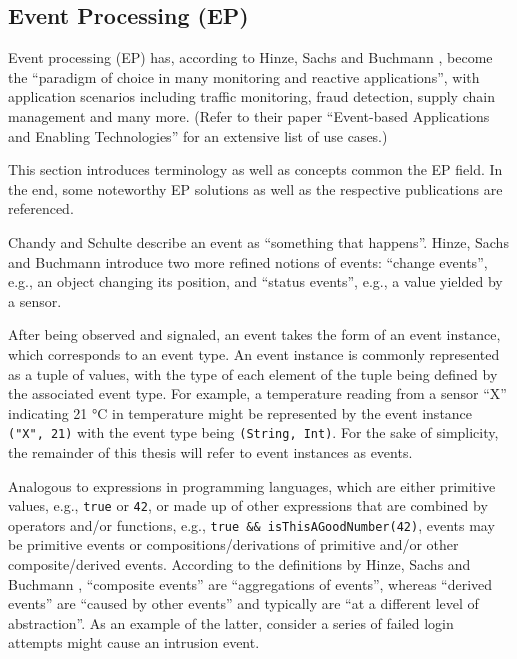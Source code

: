 \documentclass[article, 10pt, type=bsc, colorback, accentcolor=tud8b, parskip=half, bibliography=totocnumbered]{tudthesis}
\begin{document}
\subsection{Event Processing (EP)}
\label{sec:event_processing}

Event processing (EP) has, according to Hinze, Sachs and Buchmann \cite{Hinze:2009:EAE:1619258.1619260}, become the ``paradigm of choice in many monitoring and reactive applications'', with application scenarios including traffic monitoring, fraud detection, supply chain management and many more.
(Refer to their paper ``Event-based Applications and Enabling Technologies'' \cite{Hinze:2009:EAE:1619258.1619260} for an extensive list of use cases.)

This section introduces terminology as well as concepts common the EP field.
In the end, some noteworthy EP solutions as well as the respective publications are referenced.

Chandy and Schulte \cite{Chandy:2009:EPD:1594754} describe an event as ``something that happens''.
Hinze, Sachs and Buchmann \cite{Hinze:2009:EAE:1619258.1619260} introduce two more refined notions of events:
``change events'', e.g., an object changing its position, and ``status events'', e.g., a value yielded by a sensor.

After being observed and signaled, an event takes the form of an event instance, which corresponds to an event type.
An event instance is commonly represented as a tuple of values, with the type of each element of the tuple being defined by the associated event type.
For example, a temperature reading from a sensor ``X'' indicating 21 °C in temperature might be represented by the event instance \lstinline{("X", 21)} with the event type being \lstinline{(String, Int)}.
For the sake of simplicity, the remainder of this thesis will refer to event instances as events.

Analogous to expressions in programming languages, which are either primitive values, e.g., \lstinline{true} or \lstinline{42}, or made up of other expressions that are combined by operators and/or functions, e.g., \lstinline{true && isThisAGoodNumber(42)}, events may be primitive events or compositions/derivations of primitive and/or other composite/derived events.
According to the definitions by Hinze, Sachs and Buchmann \cite{Hinze:2009:EAE:1619258.1619260}, ``composite events'' are ``aggregations of events'', whereas ``derived events'' are ``caused by other events'' and typically are ``at a different level of abstraction''.
As an example of the latter, consider a series of failed login attempts might cause an intrusion event.
\end{document}
